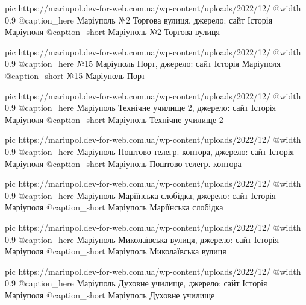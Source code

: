 	pic https://mariupol.dev-for-web.com.ua/wp-content/uploads/2022/12/%
	@width 0.9
	@caption_here Маріуполь №2 Торгова вулиця, джерело: сайт Історія Маріуполя
	@caption_short Маріуполь №2 Торгова вулиця

	pic https://mariupol.dev-for-web.com.ua/wp-content/uploads/2022/12/%
	@width 0.9
	@caption_here №15 Маріуполь Порт, джерело: сайт Історія Маріуполя
	@caption_short №15 Маріуполь Порт

	pic https://mariupol.dev-for-web.com.ua/wp-content/uploads/2022/12/%
	@width 0.9
	@caption_here Маріуполь Технічне училище 2, джерело: сайт Історія Маріуполя
	@caption_short Маріуполь Технічне училище 2

	pic https://mariupol.dev-for-web.com.ua/wp-content/uploads/2022/12/%
	@width 0.9
	@caption_here Маріуполь Поштово-телегр. контора, джерело: сайт Історія Маріуполя
	@caption_short Маріуполь Поштово-телегр. контора

	pic https://mariupol.dev-for-web.com.ua/wp-content/uploads/2022/12/%
	@width 0.9
	@caption_here Маріуполь Маріїнська слобідка, джерело: сайт Історія Маріуполя
	@caption_short Маріуполь Маріїнська слобідка

	pic https://mariupol.dev-for-web.com.ua/wp-content/uploads/2022/12/%
	@width 0.9
	@caption_here Маріуполь Миколаївська вулиця, джерело: сайт Історія Маріуполя
	@caption_short Маріуполь Миколаївська вулиця

	pic https://mariupol.dev-for-web.com.ua/wp-content/uploads/2022/12/%
	@width 0.9
	@caption_here Маріуполь Духовне училище, джерело: сайт Історія Маріуполя
	@caption_short Маріуполь Духовне училище

